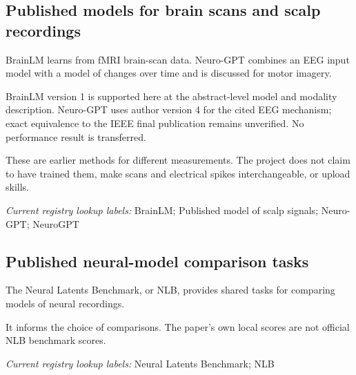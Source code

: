 \begin{samepage}
\subsection*{Published models for brain scans and scalp recordings}
\noindent BrainLM learns from fMRI brain-scan data. Neuro-GPT combines an EEG input model with a model of changes over time and is discussed for motor imagery.\cite{brainlm2023,neurogpt2024}\par
\noindent BrainLM version 1 is supported here at the abstract-level model and modality description. Neuro-GPT uses author version 4 for the cited EEG mechanism; exact equivalence to the IEEE final publication remains unverified. No performance result is transferred.\par
\end{samepage}
\begin{samepage}
\noindent These are earlier methods for different measurements. The project does not claim to have trained them, make scans and electrical spikes interchangeable, or upload skills.\par\nopagebreak[4]

\end{samepage}


\noindent\textit{Current registry lookup labels:} BrainLM; Published model of scalp signals; Neuro-GPT; NeuroGPT\par

\begin{samepage}
\subsection*{Published neural-model comparison tasks}
\noindent The Neural Latents Benchmark, or NLB, provides shared tasks for comparing models of neural recordings.\cite{nlb2021}\par
\end{samepage}
\begin{samepage}
\noindent It informs the choice of comparisons. The paper’s own local scores are not official NLB benchmark scores.\par\nopagebreak[4]

\end{samepage}


\noindent\textit{Current registry lookup labels:} Neural Latents Benchmark; NLB\par

